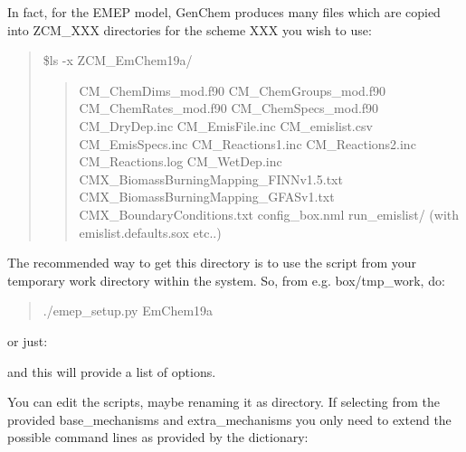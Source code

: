 \documentclass[a4paper,10pt,english]{sphinxmanual}
\begin{document}
In fact, for the EMEP model, GenChem produces many files which are
copied into ZCM\_XXX directories for the scheme XXX you wish to use:
\begin{quote}

\$ls -x ZCM\_EmChem19a/
\begin{quote}

CM\_ChemDims\_mod.f90                     CM\_ChemGroups\_mod.f90
CM\_ChemRates\_mod.f90                    CM\_ChemSpecs\_mod.f90
CM\_DryDep.inc                           CM\_EmisFile.inc
CM\_emislist.csv                         CM\_EmisSpecs.inc
CM\_Reactions1.inc                       CM\_Reactions2.inc
CM\_Reactions.log                        CM\_WetDep.inc
CMX\_BiomassBurningMapping\_FINNv1.5.txt  CMX\_BiomassBurningMapping\_GFASv1.txt
CMX\_BoundaryConditions.txt              config\_box.nml
run\_emislist/  (with emislist.defaults.sox etc..)
\end{quote}
\end{quote}

The recommended way to get this directory is to use the script  from your temporary work directory
within  the  system. So, from e.g. box/tmp\_work, do:
\begin{quote}

./emep\_setup.py  EmChem19a
\end{quote}

or just:

\begin{sphinxVerbatim}[commandchars=\\\{\}]
\end{sphinxVerbatim}

and this will provide a list of options.

You can edit the  scripts, maybe renaming it as  directory.
If selecting from the provided base\_mechanisms and extra\_mechanisms you only need to extend
the possible command lines as provided by the   dictionary:

\begin{sphinxVerbatim}[commandchars=\\\{\}]
\PYG{p}{[}\PYG{p}{]} 
\PYG{p}{[}\PYG{p}{]} 
\end{sphinxVerbatim}
\end{document}
